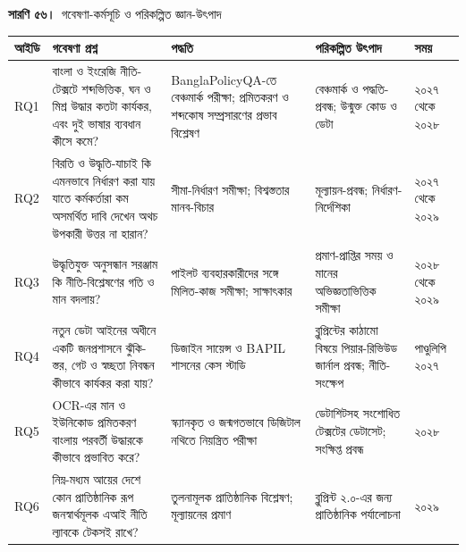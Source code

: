 \documentclass[border=10pt]{standalone}
\begin{document}
\begin{minipage}{17cm}
{\large\bfseries সারণি ৫৬।}\ {\large গবেষণা-কর্মসূচি ও পরিকল্পিত জ্ঞান-উৎপাদ}\par\vspace{7pt}
\small
{}
\begin{tabularx}{\linewidth}{@{}>{\hsize=0.372\hsize\raggedright\arraybackslash}X>{\hsize=1.596\hsize\raggedright\arraybackslash}X>{\hsize=1.170\hsize\raggedright\arraybackslash}X>{\hsize=1.277\hsize\raggedright\arraybackslash}X>{\hsize=0.585\hsize\raggedright\arraybackslash}X@{}}
\arrayrulecolor{bapilrule}\toprule
\rowcolor{white}\textbf{আইডি} & \textbf{গবেষণা প্রশ্ন} & \textbf{পদ্ধতি} & \textbf{পরিকল্পিত উৎপাদ} & \textbf{সময়} \\
\midrule
RQ1 & বাংলা ও ইংরেজি নীতি-টেক্সটে শব্দভিত্তিক, ঘন ও মিশ্র উদ্ধার কতটা কার্যকর, এবং দুই ভাষার ব্যবধান কীসে কমে? & BanglaPolicyQA-তে বেঞ্চমার্ক পরীক্ষা; প্রমিতকরণ ও শব্দকোষ সম্প্রসারণের প্রভাব বিশ্লেষণ & বেঞ্চমার্ক ও পদ্ধতি-প্রবন্ধ; উন্মুক্ত কোড ও ডেটা & ২০২৭ থেকে ২০২৮ \\
RQ2 & বিরতি ও উদ্ধৃতি-যাচাই কি এমনভাবে নির্ধারণ করা যায় যাতে কর্মকর্তারা কম অসমর্থিত দাবি দেখেন অথচ উপকারী উত্তর না হারান? & সীমা-নির্ধারণ সমীক্ষা; বিশ্বস্ততার মানব-বিচার & মূল্যায়ন-প্রবন্ধ; নির্ধারণ-নির্দেশিকা & ২০২৭ থেকে ২০২৯ \\
RQ3 & উদ্ধৃতিযুক্ত অনুসন্ধান সরঞ্জাম কি নীতি-বিশ্লেষণের গতি ও মান বদলায়? & পাইলট ব্যবহারকারীদের সঙ্গে মিলিত-কাজ সমীক্ষা; সাক্ষাৎকার & প্রমাণ-প্রাপ্তির সময় ও মানের অভিজ্ঞতাভিত্তিক সমীক্ষা & ২০২৮ থেকে ২০২৯ \\
RQ4 & নতুন ডেটা আইনের অধীনে একটি জনপ্রশাসনে ঝুঁকি-স্তর, গেট ও স্বচ্ছতা নিবন্ধন কীভাবে কার্যকর করা যায়? & ডিজাইন সায়েন্স ও BAPIL শাসনের কেস স্টাডি & ব্লুপ্রিন্টের কাঠামো বিষয়ে পিয়ার-রিভিউড জার্নাল প্রবন্ধ; নীতি-সংক্ষেপ & পাণ্ডুলিপি ২০২৭ \\
RQ5 & OCR-এর মান ও ইউনিকোড প্রমিতকরণ বাংলায় পরবর্তী উদ্ধারকে কীভাবে প্রভাবিত করে? & স্ক্যানকৃত ও জন্মগতভাবে ডিজিটাল নথিতে নিয়ন্ত্রিত পরীক্ষা & ডেটাশিটসহ সংশোধিত টেক্সটের ডেটাসেট; সংক্ষিপ্ত প্রবন্ধ & ২০২৮ \\
RQ6 & নিম্ন-মধ্যম আয়ের দেশে কোন প্রাতিষ্ঠানিক রূপ জনস্বার্থমূলক এআই নীতি ল্যাবকে টেকসই রাখে? & তুলনামূলক প্রাতিষ্ঠানিক বিশ্লেষণ; মূল্যায়নের প্রমাণ & ব্লুপ্রিন্ট ২.০-এর জন্য প্রাতিষ্ঠানিক পর্যালোচনা & ২০২৯ \\
\bottomrule
\end{tabularx}
\par\vspace{5pt}{\footnotesize\itshape উৎপাদগুলো DOI-সহ উন্মুক্ত-প্রবেশাধিকারে প্রকাশিত হবে। জার্নাল নির্বাচন পরিধি, উন্মুক্ত-প্রবেশাধিকারের সুযোগ ও পিয়ার রিভিউয়ের মান অনুযায়ী; পিয়ার রিভিউয়ের কোনো ফলাফল পূর্বানুমান করা হয় না।}
\par{}
\end{minipage}
\end{document}
